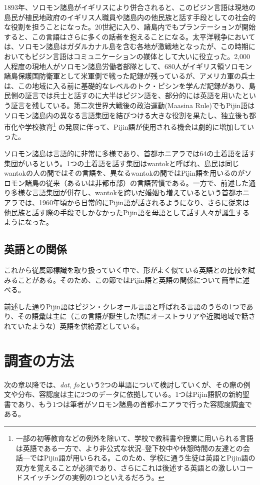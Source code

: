 1893年、ソロモン諸島がイギリスにより併合されると、このピジン言語は現地の島民が植民地政府のイギリス人職員や諸島内の他民族と話す手段としての社会的な役割を担うことになった。20世紀に入り、諸島内でもプランテーションが開始すると、この言語はさらに多くの話者を抱えることになる。太平洋戦争においては、ソロモン諸島はガダルカナル島を含む各地が激戦地となったが、この時期においてもピジン言語はコミュニケーションの媒体として大いに役立った。2,000人程度の現地人がソロモン諸島労働者部隊として、680人がイギリス領ソロモン諸島保護国防衛軍として米軍側で戦った記録が残っているが、アメリカ軍の兵士は、この地域に入る前に基礎的なレベルのトク・ピシンを学んだ記録があり、島民側の証言では兵士と話すのに大半はピジン語を、部分的には英語を用いたという証言を残している。第二次世界大戦後の政治運動(Maasina Rule)でもPijin語はソロモン諸島内の異なる言語集団を結びつける大きな役割を果たし、独立後も都市化や学校教育\footnote{
一部の初等教育などの例外を除いて、学校で教科書や授業に用いられる言語は英語である一方で、より非公式な状況--登下校中や休憩時間の友達との会話---ではPijin語が用いられる。このため、学校に通う生徒は英語とPijin語の双方を覚えることが必須であり、さらにこれは後述する英語との激しいコードスイッチングの実例の1つといえるだろう。
}
の発展に伴って、Pijin語が使用される機会は劇的に増加していった。

ソロモン諸島は言語的に非常に多様であり、首都ホニアラでは64の土着語を話す集団がいるという\citep{nativization}。1つの土着語を話す集団はwantokと呼ばれ、島民は同じwantokの人の間ではその言語を、異なるwantokの間ではPijin語を用いるのがソロモン諸島の従来（あるいは非都市部）の言語習慣である。一方で、前述した通り多様な言語集団が併存し、wantokを跨いだ婚姻も増えているという首都ホニアラでは、1960年頃から日常的にPijin語が話されるようになり、さらに従来は他民族と話す際の手段でしかなかったPijin語を母語として話す人々が誕生するようになった。

\subsection{英語との関係}
これから従属節標識を取り扱っていく中で、形がよく似ている英語との比較を試みることがある。そのため、この節ではPijin語と英語の関係について簡単に述べる。

前述した通りPijin語はピジン・クレオール言語と呼ばれる言語のうちの1つであり、その語彙は主に（この言語が誕生した頃にオーストラリアや近隣地域で話されていたような）英語を供給源としている。

\section{調査の方法}\label{sec:howexamined}
次の章以降では、\textit{dat}, \textit{fo}という2つの単語について検討していくが、その際の例文や分布、容認度は主に2つのデータに依拠している。1つはPijin語訳の新約聖書であり、もう1つは筆者がソロモン諸島の首都ホニアラで行った容認度調査である。

